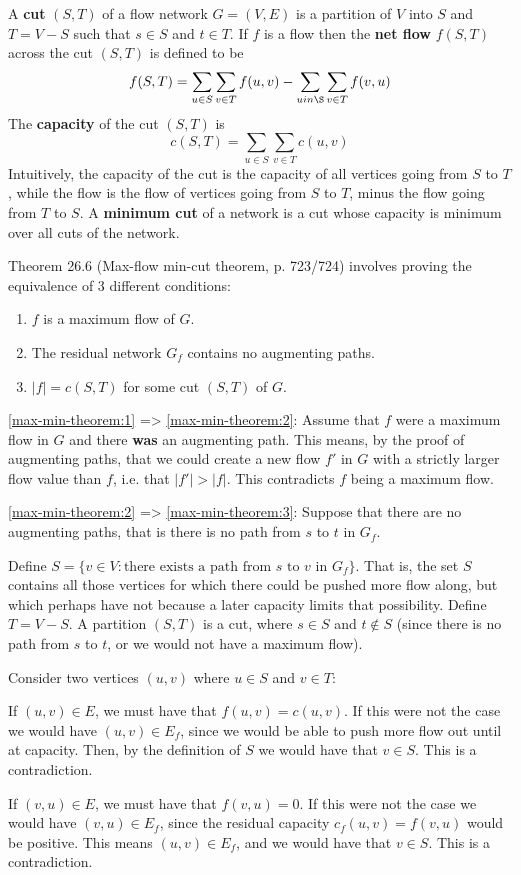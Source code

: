 A \textbf{cut} $(S,T)$ of a flow network $G = (V,E)$ is a partition of $V$ into $S$ and $T=V-S$ such that
$s \in S$ and $t \in T$. If $f$ is a flow then the \textbf{net flow} $f(S,T)$ across the cut $(S,T)$ is
defined to be
%
\[
	f(S,T) = \sum_{u \in S} \sum_{v \in T} f(u,v) - \sum_{u in \S} \sum_{v \in T} f(v,u)
\]
%
The \textbf{capacity} of the cut $(S,T)$ is
%
\[
	c(S,T) = \sum_{u \in S} \sum_{v \in T} c(u,v)
\]
%
Intuitively, the capacity of the cut is the capacity of all vertices going
from $S$ to $T$, while the flow is the flow of vertices going from $S$ to $T$,
minus the flow going from $T$ to $S$. A \textbf{minimum cut} of a network is a
cut whose capacity is minimum over all cuts of the network.

Theorem 26.6 (Max-flow min-cut theorem, p. 723/724) involves proving the equivalence of 3
different conditions:
\begin{enumerate}
	\item $f$ is a maximum flow of $G$. \label{max-min-theorem:1}
	\item The residual network $G_f$ contains no augmenting paths. \label{max-min-theorem:2}
	\item $|f| = c(S,T)$ for some cut $(S,T)$ of $G$. \label{max-min-theorem:3}
\end{enumerate}

\ref{max-min-theorem:1} => \ref{max-min-theorem:2}:
%
Assume that $f$ were a maximum flow in $G$ and there \textbf{was} an augmenting path. This
means, by the proof of augmenting paths, that we could create a new flow $f'$ in $G$ with a strictly
larger flow value than $f$, i.e. that $|f'| > |f|$. This contradicts $f$ being a maximum flow.

\ref{max-min-theorem:2} => \ref{max-min-theorem:3}:
%
Suppose that there are no augmenting paths, that is there is no path from $s$ to $t$ in $G_f$.

Define $S = \{v\in V: \text{there exists a path from $s$ to $v$ in $G_f$}\}$. That is, the set $S$
contains all those vertices for which there could be pushed more flow along, but which perhaps have
not because a later capacity limits that possibility. Define $T = V-S$. A partition $(S,T)$ is a cut,
where $s\in S$ and $t \notin S$ (since there is no path from $s$ to $t$, or we would not have a maximum
flow).

Consider two vertices $(u,v)$ where $u\in S$ and $v\in T$:

If $(u,v)\in E$, we must have that $f(u,v) = c(u,v)$. If this were not the case we would have 
$(u,v)\in E_f$, since we would be able to push more flow out until at capacity. Then, by the definition 
of $S$ we would have that $v\in S$. This is a contradiction.

If $(v,u)\in E$, we must have that $f(v,u) = 0$. If this were not the case we would have
$(v,u)\in E_f$, since the residual capacity $c_f(u,v) = f(v,u)$ would be positive. This
means $(u,v)\in E_f$, and we would have that $v\in S$. This is a contradiction.


